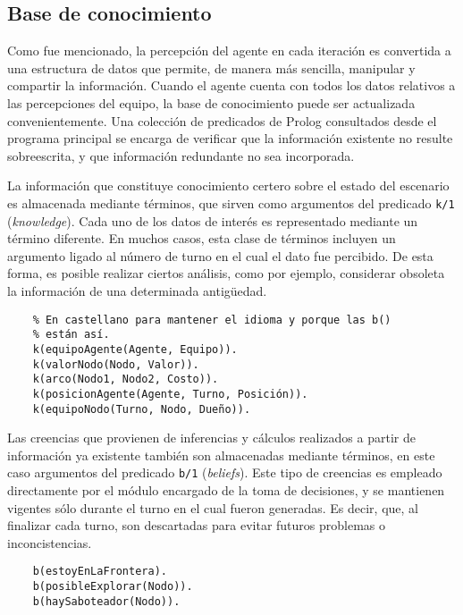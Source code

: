 \documentclass[oneside]{book}
\begin{document}
\subsection{Base de conocimiento}


Como fue mencionado, la percepción del agente en cada iteración es convertida a una 
estructura de datos que permite, de manera más sencilla, manipular y compartir la 
información. Cuando el agente cuenta con todos los datos relativos a las percepciones 
del equipo, la base de conocimiento puede ser actualizada convenientemente. Una colección 
de predicados de Prolog consultados desde el programa principal se encarga de verificar 
que la información existente no resulte sobreescrita, y que información redundante no sea 
incorporada. 

La información que constituye conocimiento certero sobre el estado del escenario es 
almacenada mediante términos, que sirven como argumentos del predicado \texttt{k/1} 
(\textit{knowledge}). Cada uno de los datos de interés es representado mediante un 
término diferente. 
En muchos casos, esta clase de términos incluyen un argumento ligado al número de turno 
en el cual el dato fue percibido. De esta forma, es posible realizar ciertos análisis, 
como por ejemplo, considerar obsoleta la información de una determinada antigüedad.

\begin{verbatim}    
	% En castellano para mantener el idioma y porque las b() 
	% están así.
    k(equipoAgente(Agente, Equipo)).
    k(valorNodo(Nodo, Valor)).
    k(arco(Nodo1, Nodo2, Costo)).
    k(posicionAgente(Agente, Turno, Posición)).
    k(equipoNodo(Turno, Nodo, Dueño)).    
\end{verbatim}

Las creencias que provienen de inferencias y cálculos realizados a partir de información 
ya existente también son almacenadas mediante términos, en este caso argumentos del 
predicado \texttt{b/1} (\textit{beliefs}). Este tipo de creencias es empleado directamente 
por el módulo encargado de la toma de decisiones, y se mantienen vigentes sólo durante el 
turno en el cual fueron generadas. Es decir, que, al finalizar cada turno, son descartadas 
para evitar futuros problemas o inconcistencias.

\begin{verbatim}
    b(estoyEnLaFrontera).
    b(posibleExplorar(Nodo)).
    b(haySaboteador(Nodo)).
\end{verbatim}
\end{document}
